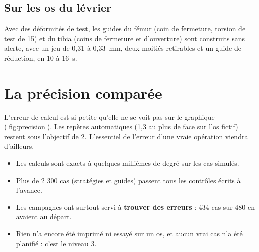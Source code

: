 \subsection{Sur les os du lévrier}

Avec des déformités de test, les guides du fémur (coin de fermeture, torsion de test de 15\degre) et du tibia (coins de
fermeture et d'ouverture) sont construits sans alerte, avec un jeu de 0,31 à 0,33~mm, deux moitiés retirables et un
guide de réduction, en 10 à 16~s.

\section{La précision comparée}


L'erreur de calcul est si petite qu'elle ne se voit pas sur le graphique (\cref{fig:precision}). Les repères
automatiques (1,3\degre{} au plus de face sur l'os fictif) restent sous l'objectif de 2\degre. L'essentiel de l'erreur
d'une vraie opération viendra d'ailleurs.

\begin{aretenir}
\begin{itemize}
  \item Les calculs sont exacts à quelques millièmes de degré sur les cas simulés.
  \item Plus de 2 300 cas (stratégies et guides) passent tous les contrôles écrits à l'avance.
  \item Les campagnes ont surtout servi à \textbf{trouver des erreurs} : 434 cas sur 480 en avaient au départ.
  \item Rien n'a encore été imprimé ni essayé sur un os, et aucun vrai cas n'a été planifié : c'est le niveau 3.
\end{itemize}
\end{aretenir}
